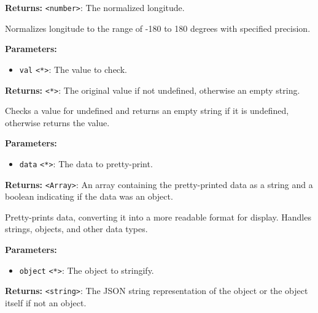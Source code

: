 \documentclass[12pt,a4paper]{article}
\begin{document}
\noindent \textbf{Returns:} \texttt{<number>}: The normalized longitude.

\noindent Normalizes longitude to the range of -180 to 180 degrees with specified precision.

\vspace{5mm}
\noindent {}


\noindent \textbf{Parameters:}
\begin{itemize}
  \item \texttt{val} \texttt{<*>}: The value to check.
\end{itemize}

\noindent \textbf{Returns:} \texttt{<*>}: The original value if not undefined, otherwise an empty string.

\noindent Checks a value for undefined and returns an empty string if it is undefined, otherwise returns the value.

\vspace{5mm}
\noindent {}


\noindent \textbf{Parameters:}
\begin{itemize}
  \item \texttt{data} \texttt{<*>}: The data to pretty-print.
\end{itemize}

\noindent \textbf{Returns:} \texttt{<Array>}: An array containing the pretty-printed data as a string and a boolean indicating if the data was an object.

\noindent Pretty-prints data, converting it into a more readable format for display. Handles strings, objects, and other data types.

\vspace{5mm}
\noindent {}


\noindent \textbf{Parameters:}
\begin{itemize}
  \item \texttt{object} \texttt{<*>}: The object to stringify.
\end{itemize}

\noindent \textbf{Returns:} \texttt{<string>}: The JSON string representation of the object or the object itself if not an object.
\end{document}
